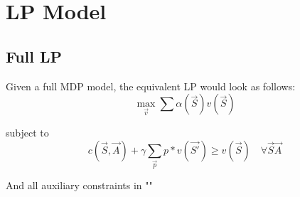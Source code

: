 \section{LP Model}

\subsection{Full LP} 
Given a full MDP model, the equivalent LP would look as follows:
\begin{equation}
	\max_{\vec{v}} \sum \alpha (\vec{S}) v(\vec{S}) 
\end{equation}

subject to
\begin{equation}
	\label{full-adp-equation}
	c(\vec{S}, \vec{A}) + \gamma \sum_{\vec{p}} p * v( \vec{S'}) 
	\ge v(\vec{S}) \quad \forall \vec{S} \vec{A}
\end{equation}

And all auxiliary constraints in ""
